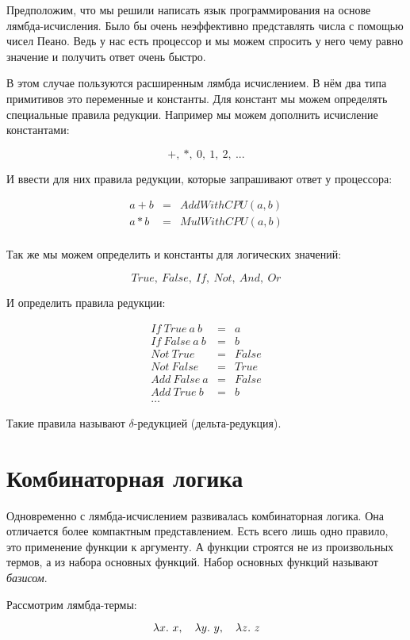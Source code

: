 Предположим, что мы решили написать язык программирования на основе
лямбда-исчисления. Было бы очень неэффективно представлять числа с
помощью чисел Пеано. Ведь у нас есть процессор и мы можем спросить у
него чему равно значение и получить ответ очень быстро.

В этом случае пользуются расширенным лямбда исчислением. В нём два типа
примитивов это переменные и константы. Для констант мы можем определять
специальные правила редукции. Например мы можем дополнить исчисление
константами:

\[+,\ *,\ 0,\ 1,\ 2,\ ...\]

И ввести для них правила редукции, которые запрашивают ответ у
процессора:

\begin{eqnarray*}
a+b &=& AddWithCPU(a, b) \\
a*b &=& MulWithCPU(a, b) \\
\end{eqnarray*}

Так же мы можем определить и константы для логических значений:

\[True,\ False,\ If,\ Not,\ And,\ Or\]

И определить правила редукции:

\begin{eqnarray*}
If\ True\ a\ b &=& a \\
If\ False\ a\ b &=& b \\
Not\ True &=& False \\
Not\ False &=& True \\
Add\ False\ a &=& False \\
Add\ True\ b &=& b \\
\dots
\end{eqnarray*}

Такие правила называют $\delta$-редукцией (дельта-редукция).

\section{Комбинаторная логика}

Одновременно с лямбда-исчислением развивалась комбинаторная логика. Она
отличается более компактным представлением. Есть всего лишь одно
правило, это применение функции к аргументу. А функции строятся не из
произвольных термов, а из набора основных функций. Набор основных
функций называют \emph{базисом}.

Рассмотрим лямбда-термы:

\[\lambda x .\  x, \quad \lambda y .\  y, \quad \lambda z .\  z\]

